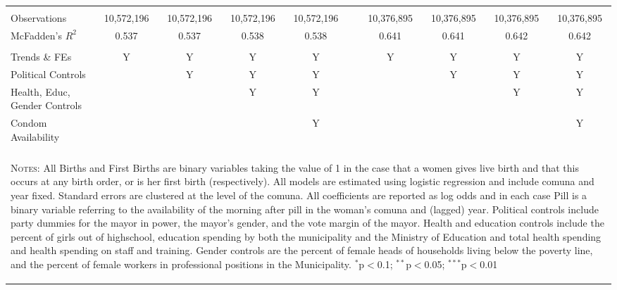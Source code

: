 \begin{landscape}
\begin{table}[!htbp]
\begin{tabular}{@{\extracolsep{5pt}}lccccp{1mm}cccc}
 & & & & & & & & & \\
Observations&10,572,196&10,572,196&10,572,196&10,572,196&&10,376,895&10,376,895&10,376,895&10,376,895\\
McFadden's $R^2$&0.537&0.537&0.538&0.538&&0.641&0.641&0.642&0.642\\
\hline \\[-1.8ex] 
{\small Trends \& FEs} & Y & Y & Y & Y && Y & Y & Y & Y \\
{\small Political Controls} & & Y & Y & Y && & Y & Y & Y \\
{\small Health, Educ, Gender Controls} & & & Y & Y && & & Y & Y \\
{\small Condom Availability} & & & & Y && & & & Y \\
\hline \hline \\[-1.8ex]
\multicolumn{10}{p{22cm}}{\begin{footnotesize}\textsc{Notes:}
All Births and First Births are binary variables taking the value
of 1 in the case that a women gives live birth and that this
occurs at any birth order, or is her first birth (respectively).
All models are estimated using logistic regression and include
comuna and year fixed. Standard errors are clustered at the level
of the comuna.  All coefficients are
reported as log odds and in each case Pill is a binary variable
referring to the availability of the morning after pill in the
woman's comuna and (lagged) year.  Political controls include
party dummies for the mayor in power, the mayor's gender, and
the vote margin of the mayor.  Health and education controls
include the percent of girls out of highschool, education
spending by both the municipality and the Ministry of Education
and total health spending and health spending on staff and
training.  Gender controls are the percent of female heads of
 households living below the poverty line, and the percent of
female workers in professional positions in the Municipality.
$^{*}$p$<$0.1; $^{**}$p$<$0.05; $^{***}$p$<$0.01\end{footnotesize}}
\normalsize\end{tabular}\end{table}\end{landscape}
